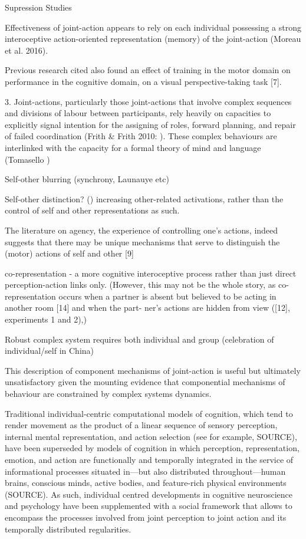 Supression Studies


Effectiveness of joint-action appears to rely on each individual possessing a strong interoceptive action-oriented representation (memory) of the joint-action (Moreau et al. 2016).

Previous research cited also found an effect of training in the motor domain on performance in the cognitive domain, on a visual perspective-taking task [7].




3. Joint-actions, particularly those joint-actions that involve complex sequences and divisions of labour between participants, rely heavily on capacities to explicitly signal intention for the assigning of roles, forward planning, and repair of failed coordination (Frith & Frith 2010: ).  These complex behaviours are interlinked with the capacity for a formal theory of mind and language (Tomasello )



Self-other blurring (synchrony, Launauye etc)

Self-other distinction? ()
increasing other-related activations, rather than the control of self and other representations as such.

The literature on agency, the experience of controlling one’s actions, indeed suggests that there may be unique mechanisms that serve to distinguish the (motor) actions of self and other [9]

co-representation - a more cognitive interoceptive process rather than just direct perception-action links only.
(However, this may not be the whole story, as co-representation occurs when a partner is absent but believed to be acting in another room [14] and when the part- ner’s actions are hidden from view ([12], experiments 1 and 2),)



Robust complex system requires both individual and group (celebration of individual/self in China)











This description of component mechanisms of joint-action is useful but ultimately unsatisfactory given the mounting evidence that componential mechanisms of behaviour are constrained by complex systems dynamics.

Traditional individual-centric computational models of cognition, which tend to render movement as the product of a linear sequence of sensory perception, internal mental representation, and action selection (see for example, SOURCE), have been superseded by models of cognition in which perception, representation, emotion, and action are functionally and temporally integrated in the service of informational processes situated in—but also distributed throughout—human brains, conscious minds, active bodies, and feature-rich physical environments (SOURCE). As such, individual centred developments in cognitive neuroscience and psychology have been supplemented with a social framework that allows to encompass the processes involved from joint perception to joint action and its temporally distributed regularities.


